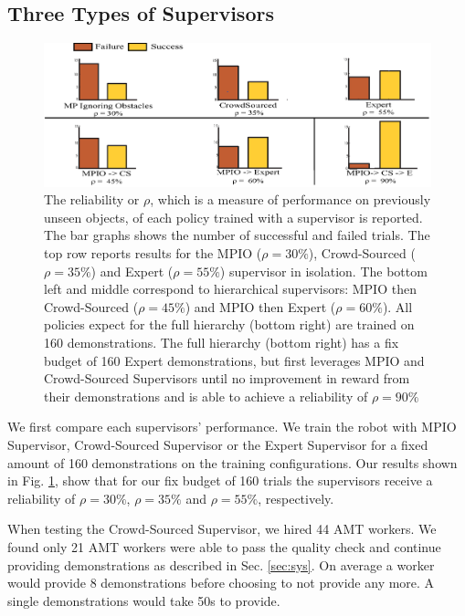 \documentclass[10pt, conference]{ieeeconf}      %
\begin{document}
\subsection{Three Types of Supervisors}

\begin{figure}[t]
\centering
\includegraphics{f_figs/results.eps}

\caption{ \footnotesize The reliability or $\rho$, which is a measure of performance on previously unseen objects, of each policy trained with a supervisor is reported. The bar graphs
shows the number of successful and failed trials. The top row 
reports results for the MPIO ($\rho = 30\%$), Crowd-Sourced ($\rho = 35\%$) and  Expert ($\rho = 55\%$) supervisor in isolation.
The bottom  left and middle correspond to hierarchical supervisors: MPIO then Crowd-Sourced ($\rho = 45\%$) and MPIO then Expert ($\rho = 60\%$). All policies expect for the full hierarchy (bottom right) are trained on 160 demonstrations. The full hierarchy (bottom right)  has a fix budget of 160 Expert demonstrations, but  first leverages MPIO and Crowd-Sourced Supervisors until no improvement in reward from their demonstrations and is able to achieve a reliability of $\rho = 90\%$}
\vspace*{-20pt}
\label{fig:perf_results}
\end{figure}

We first compare each supervisors' performance. We train the robot with MPIO Supervisor, Crowd-Sourced Supervisor or the Expert Supervisor for a fixed amount of 160 demonstrations on the training configurations. Our results shown in Fig. \ref{fig:perf_results}, show that for our fix budget of 160 trials the supervisors receive a reliability of $\rho = 30\%$, $\rho = 35\%$ and $\rho = 55\%$, respectively. 

When testing the Crowd-Sourced Supervisor, we hired  44 AMT workers. We found only
21 AMT workers were able to pass the quality check and continue providing demonstrations as described in Sec. \ref{sec:sys}. On average a worker would
provide 8 demonstrations before choosing to not provide any more. A single demonstrations would take 50s to provide.  
\end{document}
